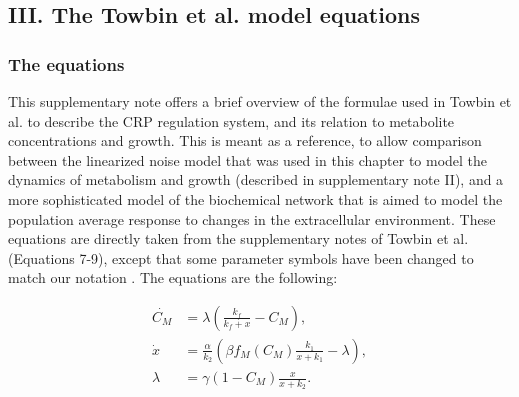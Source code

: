 

\subsection*{III. The Towbin et al. model equations}

\subsubsection*{The equations}


This supplementary note offers a brief overview of the formulae used in Towbin et al. to describe the CRP regulation system, and its relation to metabolite concentrations and growth.
%
This is meant as a reference, to allow comparison between the linearized noise model that was used in this chapter to model the dynamics of metabolism and growth (described in supplementary note II), and a more sophisticated model of the biochemical network that is aimed to model the population average response to changes in the extracellular environment. 
%
These equations are directly taken from the supplementary notes of Towbin et al. (Equations 7-9), except that some parameter symbols have been changed to match our notation \cite{Towbin2017}.
%
The equations are the following:

\begin{align}
	\label{eq:TB:dotM}
	\dot{C_M} & = \lambda ( \frac{k_f}{k_f+x} - C_M) ,\\
	\label{eq:TB:dotx}
	\dot{x} & = \frac{\alpha}{k_2} \left(    \beta f_M(C_M) \frac{k_1}{x+k_1}  -    \lambda    \right) ,\\
	\label{eq:TB:mu}
	\lambda & =\gamma(1-C_M) \frac{x}{x+k_2}
	.
\end{align}

